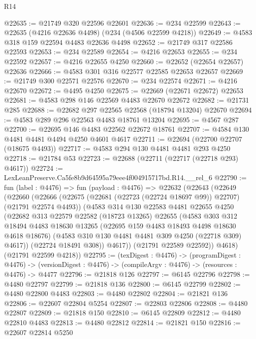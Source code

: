 \begin{lexlean}{R14}
\begin{coremodule}
@22635 := @21749 @320 @22596 @22601
@22636 := @234 @22599
@22643 := @22635 (@4216 @22636 @4498) (@234 (@4506 @22599 @4218))
@22649 := @4583 @318 @159 @22594 @4483 @22636 @4498
@22652 := @21749 @317 @22586 @22593
@22653 := @234 @22589
@22654 := @4216 @22653
@22655 := @234 @22592
@22657 := @4216 @22655 @4250
@22660 := @22652 (@22654 @22657) @22636
@22666 := @4583 @301 @316 @22577 @22585 @22653 @22657
@22669 := @21749 @300 @22571 @22576
@22670 := @234 @22574
@22671 := @4216 @22670
@22672 := @4495 @4250
@22675 := @22669 (@22671 @22672) @22653
@22681 := @4583 @298 @146 @22569 @4483 @22670 @22672
@22682 := @21731 @285
@22688 := @22682 @297 @22565 @22568 (@18794 @13204) @22670
@22694 := @4583 @289 @296 @22563 @4483 @18761 @13204
@22695 := @4567 @287
@22700 := @22695 @146 @4483 @22562 @22672 @18761
@22707 := @4584 @130 @4481 @4481 @4494 @4250 @4601 @4617
@22711 := @22694 (@22700 @22707 (@18675 @4493))
@22717 := @4583 @294 @130 @4481 @4481 @293 @4250
@22718 := @21784 @53
@22723 := @22688 (@22711 (@22717 (@22718 @293) @4617))
@22724 := LexLeanPreserve.Ca5fe8b9d64595a79eee4f004915717bd.R14.__rel_6
@22790 := fun (label : @4476) =>
  fun (payload : @4476) =>
  @22632
    (@22643
      (@22649
        (@22660
          (@22666
            (@22675 (@22681 (@22723 (@22724 @18697 @99)) @22707) (@21791 @22574 @4493))
            (@4583
              @314
              @130
              @22583
              @4481
              @22655
              @4250
              (@22682
                @313
                @22579
                @22582
                (@18723 @13265)
                @22655
                (@4583
                  @303
                  @312
                  @18494
                  @4483
                  @18630
                  @13265
                  (@22695 @159 @4483 @18493 @4498 @18630 @4618 @18676)
                  (@4583 @310 @130 @4481 @4481 @309 @4250 (@22718 @309) @4617))
                (@22724 @18491 @308))
              @4617))
          (@21791 @22589 @22592))
        @4618)
      (@21791 @22599 @4218))
@22795 := (texDigest : @4476) ->
  (programDigest : @4476) ->
  (versionDigest : @4476) -> (compileArgv : @4476) -> (resources : @4476) -> @4477
@22796 := @21818 @126
@22797 := @6145 @22796
@22798 := @4480 @22797
@22799 := @21818 @136
@22800 := @6145 @22799
@22802 := @4480 @22800 @4483
@22803 := @4480 @22802
@22804 := @21821 @136
@22806 := @22607 @22804 @5254
@22807 := @22803 @22806
@22808 := @4480 @22807
@22809 := @21818 @150
@22810 := @6145 @22809
@22812 := @4480 @22810 @4483
@22813 := @4480 @22812
@22814 := @21821 @150
@22816 := @22607 @22814 @5250

\end{coremodule}
\end{lexlean}
